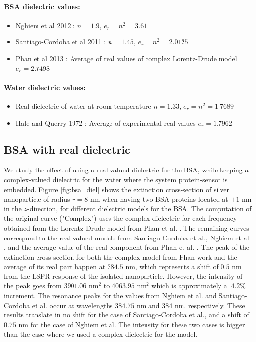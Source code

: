 \paragraph{BSA dielectric values:}
\begin{itemize}
    \item {Nghiem et al 2012 \cite{NghiemETal2012}: $n=1.9$, $e_r = n^2 = 3.61$}
    \item {Santiago-Cordoba et al 2011 \cite{SantiagoCordobaETal2011}: $n=1.45$, $e_r = n^2 = 2.0125$}
    \item {Phan et al 2013 \cite{PhanETal2013}: Average of real values of complex Lorentz-Drude model $e_r = 2.7498$}
\end{itemize}

\paragraph{Water dielectric values:}
\begin{itemize}
    \item {Real dielectric of water at room temperature $n=1.33$, $e_r = n^2 = 1.7689$}
    \item {Hale and Querry 1972 \cite{HaleQuerry1972}: Average of experimental real values $e_r = 1.7962$}
\end{itemize}
  
\subsection{BSA with real dielectric}

We study the effect of using a real-valued dielectric for the BSA, while keeping a complex-valued dielectric for the water where  
the system protein-sensor is embedded. Figure \ref{fig:bsa_diel} shows the extinction cross-section of silver nanoparticle 
of radius $r=8$ nm when having two BSA proteins located at $\pm1$ nm in the $z$-direction, for different dielectric models for the BSA. 
The computation of the original curve ("Complex") uses the complex dielectric for each frequency obtained from the Lorentz-Drude model 
from Phan et al. \cite{PhanETal2013}. The remaining curves correspond to the real-valued models from Santiago-Cordoba et al.\cite{SantiagoCordobaETal2011},
Nghiem et al \cite{NghiemETal2012}, and the average value of the real component from Phan et al. \cite{PhanETal2013}. The peak of the extinction cross section 
for both the complex model from Phan work \cite{PhanETal2013} and the average of its real part happen at $384.5$ nm, which represents a shift of $0.5$ nm from 
the LSPR response of the isolated nanoparticle. However, the intensity of the peak goes from $3901.06$ nm$^2$ to $4063.95$ nm$^2$ which is approximately a $~4.2\%$ increment. 
The resonance peaks for the values from Nghiem et al. and Santiago-Cordoba et al. occur at wavelengths $384.75$ nm and $384$ nm, respectively. These results 
translate in no shift for the case of Santiago-Cordoba et al., and a shift of $0.75$ nm for the case of Nghiem et al. The intensity for these two cases is 
bigger than the case where we used a complex dielectric for the model. 


